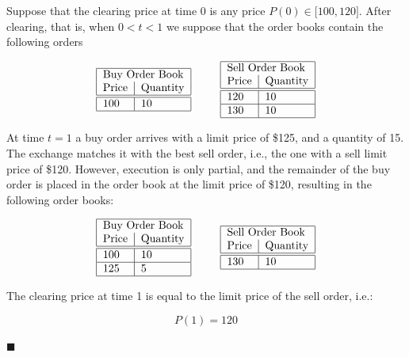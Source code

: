 \documentclass{article}
\begin{document}

\begin{example}
Suppose that the clearing price at time $0$ is any price $P(0)\in \lbrack
100,120]$. After clearing, that is, when $0<t<1$ we suppose that the order
books contain the following orders

\begin{equation*}
\begin{tabular}{|l|l|}
\hline
\multicolumn{2}{|l|}{Buy Order Book} \\
Price & Quantity \\ \hline\hline
100 & 10 \\ \hline
\end{tabular}%
\text{ \ \ \ \ \ }%
\begin{tabular}{|l|l|}
\hline
\multicolumn{2}{|l|}{Sell Order Book} \\
Price & Quantity \\ \hline\hline
120 & 10 \\ \hline
130 & 10 \\ \hline
\end{tabular}%
\end{equation*}

At time $t=1$ a buy order arrives with a limit price of \$125, and a
quantity of 15. The exchange matches it with the best sell order, i.e., the
one with a sell limit price of \$120. However, execution is only partial,
and the remainder of the buy order is placed in the order book at the limit
price of \$120, resulting in the following order books:

\begin{equation*}
\begin{tabular}{|l|l|}
\hline
\multicolumn{2}{|l|}{Buy Order Book} \\
Price & Quantity \\ \hline\hline
100 & 10 \\ \hline
125 & 5 \\ \hline
\end{tabular}%
\text{ \ \ \ \ \ }%
\begin{tabular}{|l|l|}
\hline
\multicolumn{2}{|l|}{Sell Order Book} \\
Price & Quantity \\ \hline\hline
130 & 10 \\ \hline
\end{tabular}%
\end{equation*}

The clearing price at time 1 is equal to the limit price of the sell order,
i.e.:

\begin{equation*}
P(1)=120
\end{equation*}

$\blacksquare $

\end{example}
\end{document}
